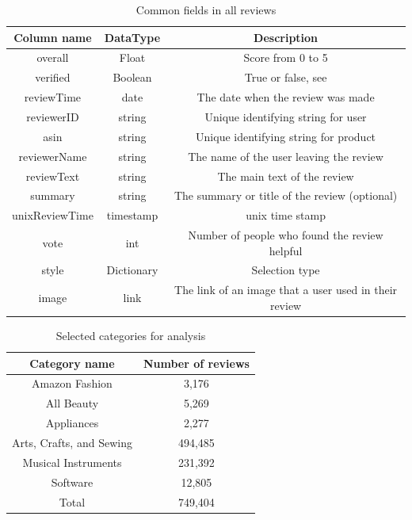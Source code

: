 \documentclass[stu,12pt,floatsintext]{apa7}
\begin{document}
\begin{table}[!htb]
    \centering

    \caption{Common fields in all reviews}
    \begin{tabular}{ccc}
        \hline
        Column name & DataType  &Description\\ 
        \hline
        overall & Float  &Score from 0 to 5\\
        verified & Boolean  &True or false, see \cite{amazon2024help_verified}\\
        reviewTime & date  & The date when the review was made\\
        reviewerID & string  & Unique identifying string for user\\
        asin & string  & Unique identifying string for product\\
        reviewerName & string  &The name of the user leaving the review\\
        reviewText & string  &The main text of the review\\
        summary & string  &The summary or title of the review (optional)\\
        unixReviewTime & timestamp  &unix time stamp\\ 
        vote & int & Number of people who found the review helpful \\
        style & Dictionary & Selection type\\
        image & link & The link of an image that a user used in their review\\
        \hline
    \end{tabular}
    \label{tab:amazon_review_cols}

\end{table}

\begin{table}[!htb]
    \centering

    \caption{Selected categories for analysis}
    \begin{tabular}{cc}
        \hline
        Category name & Number of reviews  \\ 
        \hline
        Amazon Fashion & 3,176  \\
        All Beauty & 5,269  \\
        Appliances & 2,277  \\
        Arts, Crafts, and Sewing & 494,485  \\
        Musical Instruments & 231,392  \\
        Software & 12,805  \\
        Total & 749,404 \\
        \hline
    \end{tabular}
    \label{tab:amazon-categories}

\end{table}
\end{document}
